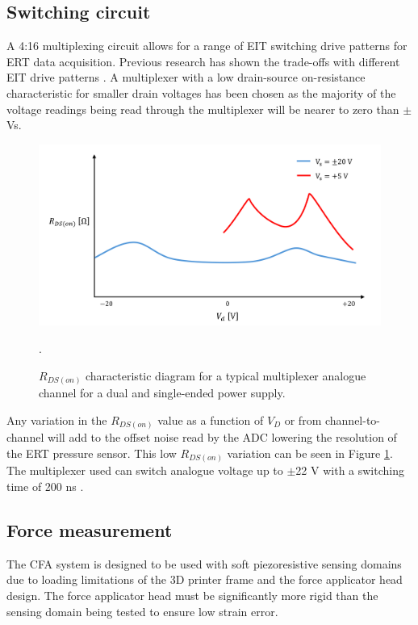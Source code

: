\subsection{Switching circuit}
A 4:16 multiplexing circuit allows for a range of EIT switching drive patterns for ERT data acquisition. Previous research has shown the trade-offs with different EIT drive patterns \cite{Tawil2011, Russo2017, Xu2008}. A multiplexer with a low drain-source on-resistance characteristic for smaller drain voltages has been chosen as the majority of the voltage readings being read through the multiplexer will be nearer to zero than $\pm$Vs.
\begin{figure}[H]
\centering
\includegraphics[width=0.6\linewidth]{Figures/mux_r_on_example.png}
\caption{$R_{DS(on)}$ characteristic diagram for a typical multiplexer analogue channel for a dual and single-ended power supply.}\cite{Vishay2024}.
\label{fig:mux_r_on}
\end{figure}


Any variation in the $R_{DS(on)}$ value as a function of $V_D$ or from channel-to-channel will add to the offset noise read by the ADC lowering the resolution of the ERT pressure sensor. This low $R_{DS(on)}$ variation can be seen in Figure \ref{fig:mux_r_on}. The multiplexer used can switch analogue voltage up to $\pm$22 V with a switching time of 200 ns \cite{Vishay2024}.


\subsection{Force measurement}
The CFA system is designed to be used with soft piezoresistive sensing domains due to loading limitations of the 3D printer frame and the force applicator head design. The force applicator head must be significantly more rigid than the sensing domain being tested to ensure low strain error. 

